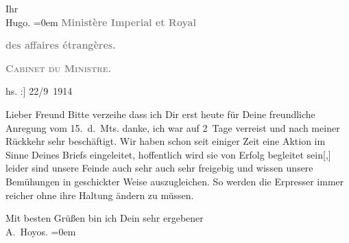 \pstart
           Ihr{\\[\baselineskip]}\spacefill\mbox{Hugo.}\pend
           \leftskip=0em{}\vspace{1em}{\vspace{1\baselineskip}}
\pstart
           {\pb}\textcolor{gray}{\textbf{Ministère Imperial et Royal}}\pend
           
\pstart
           \textcolor{gray}{\textbf{des affaires étrangères.}}\pend
           
\pstart
           \textcolor{gray}{\textbf{\textsc{Cabinet du Ministre.}}}\pend
           
\pstart
           \raggedleft{}{[}hs. :{]} 22/9 1914\pend
           
\pstart{}Lieber Freund\pend\vspace{0.5em}
\pstart
           Bitte verzeihe dass ich Dir erst heute für Deine freundliche Anregung vom
                  15. d. Mts. danke, ich war auf 2 Tage verreist und nach meiner
               Rückkehr sehr beschäftigt. Wir haben schon seit einiger Zeit eine Aktion im Sinne
               Deines Briefs {\pb}eingeleitet,
               hoffentlich wird sie von Erfolg begleitet sein{[},{]} leider sind
               unsere Feinde auch sehr auch sehr freigebig und wissen unsere Bemühungen in
               geschickter Weise auszugleichen. So werden die Erpresser immer reicher ohne ihre
               Haltung ändern zu müssen.\pend
           
\pstart
           Mit besten Grüßen bin ich {\pb}Dein sehr ergebener {\\[\baselineskip]}\spacefill\mbox{A. Hoyos.}\pend
           \leftskip=0em{}\endnumbering{}  
      